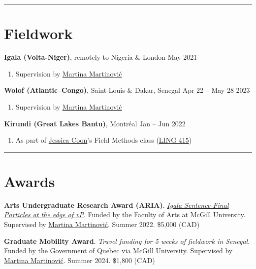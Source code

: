 \documentclass[margin,line]{resume}
\begin{document}
\begin{resume}
	\vspace{-0.9em}\rule{\textwidth}{0.4pt}



	\section{\mysidestyle Fieldwork}

	\textbf{Igala (Volta-Niger)}, remotely to Nigeria \& London \hfill May 2021 --
	\begin{enumerate}[-, leftmargin=1em, topsep=4pt]
		\item[] Supervision by \href{https://inamartinovic.com/}{Martina Martinović}
	\end{enumerate}


	\textbf{Wolof (Atlantic–Congo)}, Saint-Louis \& Dakar, Senegal \hfill Apr 22 -- May 28 2023
	\begin{enumerate}[-, leftmargin=1em, topsep=4pt]
		\item[] Supervision by \href{https://inamartinovic.com/}{Martina Martinović}
	\end{enumerate}

	\textbf{Kirundi (Great Lakes Bantu)}, Montréal \hfill Jan -- Jun 2022
	\begin{enumerate}[-, leftmargin=1em, topsep=4pt]
		\item[] As part of \href{https://jessica.lingspace.org/}{Jessica Coon}'s Field Methods class (\href{https://www.mcgill.ca/study/2021-2022/courses/ling-415}{LING 415})
	\end{enumerate}

	\vspace{-0.9em}\rule{\textwidth}{0.4pt}


	\section{\mysidestyle Awards}

	 {\textbf{Arts Undergraduate Research Award (ARIA)}. \href{https://www.mcgill.ca/arts-internships/files/arts-internships/brandon_chaperon.pdf}{\textit{Igala Sentence-Final Particles at the edge of \textit{v}P}}. Funded by the Faculty of Arts at McGill University. Supervised by \href{https://inamartinovic.com/}{Martina Martinović}. Summer 2022. \$5,000 (CAD)}

	 {\textbf{Graduate Mobility Award}. \textit{Travel funding for 5 weeks of fieldwork in Senegal}. Funded by the Government of Quebec via McGill University. Supervised by \href{https://inamartinovic.com/}{Martina Martinović}. Summer 2024. \$1,800 (CAD)}



\end{resume}
\end{document}

